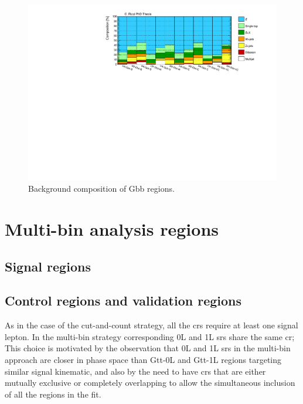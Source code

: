 \begin{figure}[h]
\includegraphics[width=\textwidth]{figures/strong_prod/comp_plots/Gbb_bkg.pdf}
\caption{Background composition of Gbb regions.}
	\label{fig:bkgcomp_Gbb}
\end{figure}

\clearpage

\section{Multi-bin analysis regions}

\subsection*{Signal regions}

\subsection*{Control regions and validation regions}

As in the case of the cut-and-count strategy, all the \glspl{cr} require at least one signal lepton. 
In the multi-bin strategy corresponding 0L and 1L \glspl{sr} share the same \gls{cr};
This choice is motivated by the observation that 0L and 1L \glspl{sr} in the multi-bin approach are 
closer in phase space than Gtt-0L and Gtt-1L regions targeting similar signal kinematic, 
and also by the need to have \glspl{cr} that are either mutually exclusive or completely overlapping to 
allow the simultaneous inclusion of all the regions in the fit. 


